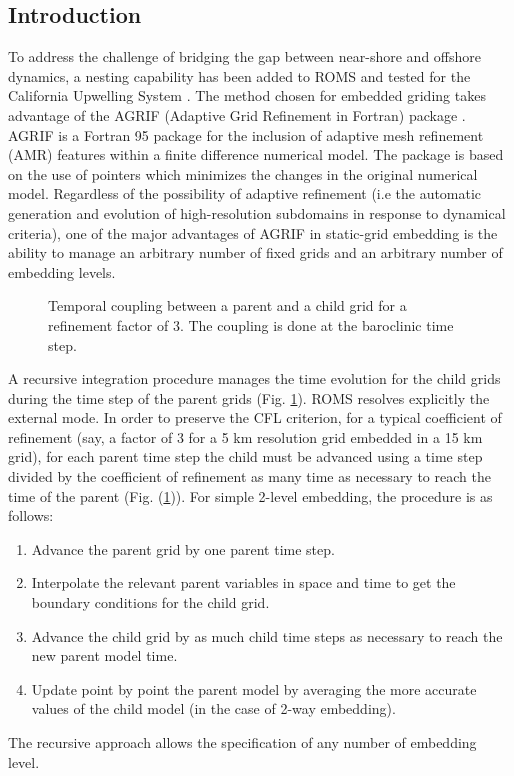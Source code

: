 %
%

\subsection{Introduction}

To address the challenge of bridging the gap between near-shore and
offshore dynamics, a nesting capability has been added to ROMS
and tested for the California Upwelling System \citep{Pen04}.
The method chosen for embedded griding takes advantage of the AGRIF
(Adaptive Grid Refinement in Fortran) package \citep{Bla99,Deb00,
Deb03a,Deb03b}.
AGRIF is a Fortran 95 package for the inclusion of adaptive mesh refinement
(AMR) features within a finite difference numerical model.  The
package is based on the use of pointers which minimizes the changes in
the original numerical model.  Regardless of the possibility of
adaptive refinement (i.e the automatic generation and evolution of
high-resolution subdomains in response to dynamical criteria), one of
the major advantages of AGRIF in static-grid embedding is the ability to
manage an arbitrary number of fixed grids and an arbitrary number of
embedding levels.

\begin{figure}[htbp]
\centerline{}
\caption{Temporal coupling between a parent and a child grid
for a refinement factor of 3.  The coupling is done at the baroclinic
time step.}
\label{fig:temp_coupling}
\end{figure}

A recursive integration procedure manages the time evolution for the
child grids during the time step of the parent grids
(Fig. \ref{fig:temp_coupling}).  ROMS resolves explicitly the external
mode.  In order to preserve the CFL criterion, for a typical
coefficient of refinement (say, a factor of 3 for a 5 km resolution
grid embedded in a 15 km grid), for each parent time step the child
must be advanced using a time step divided by the coefficient of
refinement as many time as necessary to reach the time of the parent
(Fig.  (\ref{fig:temp_coupling})).  For simple 2-level embedding, the
procedure is as follows:
\begin{enumerate}
\item Advance the parent grid by one parent time step.
\item Interpolate the relevant parent variables in space and time
to get the boundary conditions for the child grid.
\item Advance the child grid by as much child time steps as necessary
to reach the new parent model time.
\item Update point by point the parent model by averaging the more
accurate values of the child model (in the case of 2-way embedding).
\end{enumerate}
The recursive approach allows the specification of any number
of embedding level.

